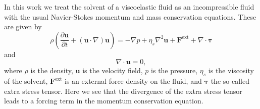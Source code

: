 \newpage
In this work we treat the solvent of a viscoelastic fluid as an incompressible fluid with the usual Navier-Stokes momentum and mass conservation equations. These are given by
\begin{equation}\label{eq:momentum_conservation}
\rho \left( \frac{\partial \bm{u}}{\partial t} + \left(\bm{u} \cdot \nabla\right)\bm{u}\right) =
-\nabla p +\eta_s \nabla^2 \bm{u} + \bm{F}^{\mathrm{ext}} + \nabla \cdot \bm{\tau} 
\end{equation}
and
\begin{equation}\label{eq:mass_conservation}
\nabla \cdot \bm{u} = 0,
\end{equation}
where $\rho$ is the density, $\bm{u}$ is the velocity field, $p$ is the pressure, $\eta_s$ is the viscosity of the solvent, $\bm{F}^{\mathrm{ext}}$ is an external force density on the fluid, and $\bm{\tau}$ the so-called extra stress tensor. Here we see that the divergence of the extra stress tensor leads to a forcing term in the momentum conservation equation. 

